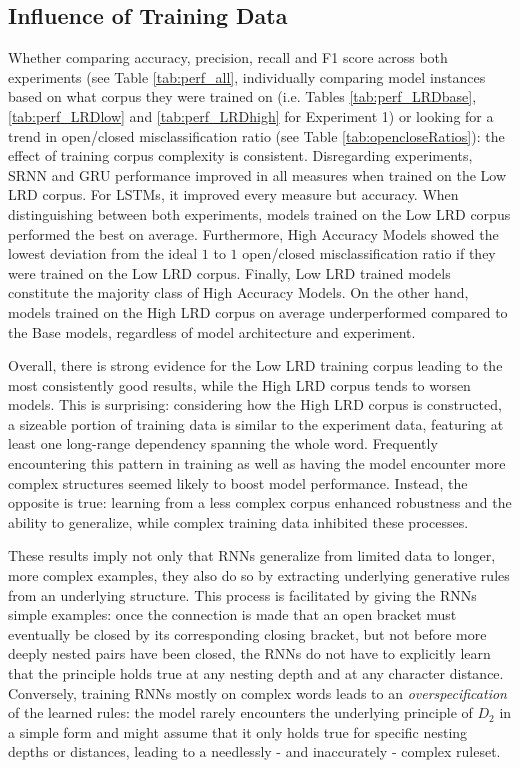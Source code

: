\subsection{Influence of Training Data}
Whether comparing accuracy, precision, recall and F1 score across both experiments (see Table \ref{tab:perf_all}, individually comparing model instances based on what corpus they were trained on (i.e. Tables \ref{tab:perf_LRDbase}, \ref{tab:perf_LRDlow} and \ref{tab:perf_LRDhigh} for Experiment 1) or looking for a trend in open/closed misclassification ratio (see Table \ref{tab:opencloseRatios}): the effect of training corpus complexity is consistent. Disregarding experiments, SRNN and GRU performance improved in all measures when trained on the Low LRD corpus. For LSTMs, it improved every measure but accuracy. When distinguishing between both experiments, models trained on the Low LRD corpus performed the best on average. Furthermore, High Accuracy Models showed the lowest deviation from the ideal $1$ to $1$ open/closed misclassification ratio if they were trained on the Low LRD corpus. Finally, Low LRD trained models constitute the majority class of High Accuracy Models. On the other hand, models trained on the High LRD corpus on average underperformed compared to the Base models, regardless of model architecture and experiment.

Overall, there is strong evidence for the Low LRD training corpus leading to the most consistently good results, while the High LRD corpus tends to worsen models. This is surprising: considering how the High LRD corpus is constructed, a sizeable portion of training data is similar to the experiment data, featuring at least one long-range dependency spanning the whole word. Frequently encountering this pattern in training as well as having the model encounter more complex structures seemed likely to boost model performance. Instead, the opposite is true: learning from a less complex corpus enhanced robustness and the ability to generalize, while complex training data inhibited these processes.

These results imply not only that RNNs generalize from limited data to longer, more complex examples, they also do so by extracting underlying generative rules from an underlying structure. This process is facilitated by giving the RNNs simple examples: once the connection is made that an open bracket must eventually be closed by its corresponding closing bracket, but not before more deeply nested pairs have been closed, the RNNs do not have to explicitly learn that the principle holds true at any nesting depth and at any character distance. Conversely, training RNNs mostly on complex words leads to an \textit{overspecification} of the learned rules: the model rarely encounters the underlying principle of $D_{2}$ in a simple form and might assume that it only holds true for specific nesting depths or distances, leading to a needlessly - and inaccurately - complex ruleset.